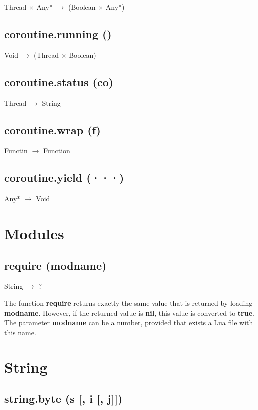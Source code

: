 \documentclass[12pt]{article}
\begin{document}
Thread $\times$ Any* $\rightarrow$ (Boolean $\times$ Any*)

\subsection{coroutine.running ()}

Void $\rightarrow$ (Thread $\times$ Boolean)

\subsection{coroutine.status (co)}

Thread $\rightarrow$ String

\subsection{coroutine.wrap (f)}

Functin $\rightarrow$ Function 

\subsection{coroutine.yield (···)}

Any* $\rightarrow$ Void

\newpage

\section{Modules}

\subsection{require (modname)}

String $\rightarrow$ ?

The function \textbf{require} returns exactly the same value that is
returned by loading \textbf{modname}.
However, if the returned value is \textbf{nil}, this value is
converted to \textbf{true}.
The parameter \textbf{modname} can be a number, provided that exists
a Lua file with this name.

\newpage

\section{String}

\subsection{string.byte (s [, i [, j]])}
\end{document}
